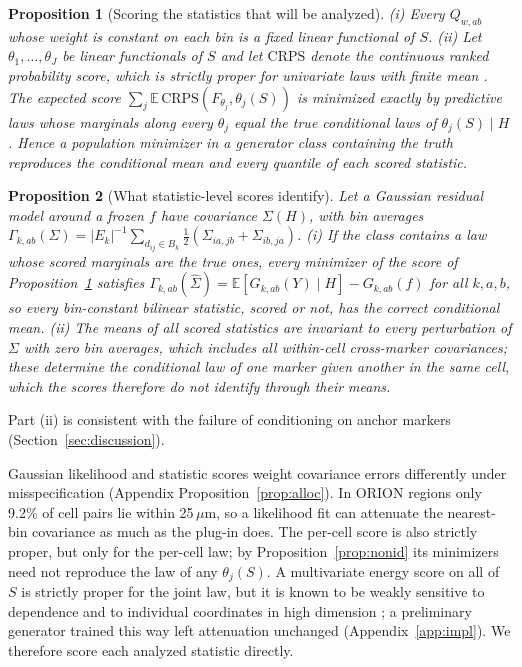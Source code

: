 \documentclass[10pt,letterpaper]{article}
\newtheorem{proposition}{Proposition}
\theoremstyle{definition}
\theoremstyle{remark}
\newcommand{\E}{\mathbb{E}}
\begin{document}
\begin{proposition}[Scoring the statistics that will be analyzed]\label{prop:proper}
(i) Every $Q_{w,ab}$ whose weight is constant on each bin is a fixed linear functional of $S$. (ii) Let $\theta_1,\dots,\theta_J$ be linear functionals of $S$ and let $\mathrm{CRPS}$ denote the continuous ranked probability score, which is strictly proper for univariate laws with finite mean \citep{gneiting2007}. The expected score $\sum_j\E\,\mathrm{CRPS}(F_{\theta_j},\theta_j(S))$ is minimized exactly by predictive laws whose marginals along every $\theta_j$ equal the true conditional laws of $\theta_j(S)\mid H$. Hence a population minimizer in a generator class containing the truth reproduces the conditional mean and every quantile of each scored statistic.
\end{proposition}
\begin{proposition}[What statistic-level scores identify]\label{prop:ident}
Let a Gaussian residual model around a frozen $f$ have covariance $\Sigma(H)$, with bin averages $\Gamma_{k,ab}(\Sigma)=|E_k|^{-1}\sum_{d_{ij}\in B_k}\tfrac12(\Sigma_{ia,jb}+\Sigma_{ib,ja})$. (i) If the class contains a law whose scored marginals are the true ones, every minimizer of the score of Proposition~\ref{prop:proper} satisfies $\Gamma_{k,ab}(\hat\Sigma)=\E[G_{k,ab}(Y)\mid H]-G_{k,ab}(f)$ for all $k,a,b$, so every bin-constant bilinear statistic, scored or not, has the correct conditional mean. (ii) The means of all scored statistics are invariant to every perturbation of $\Sigma$ with zero bin averages, which includes all within-cell cross-marker covariances; these determine the conditional law of one marker given another in the same cell, which the scores therefore do not identify through their means.
\end{proposition}
Part (ii) is consistent with the failure of conditioning on anchor markers (Section~\ref{sec:discussion}).

Gaussian likelihood and statistic scores weight covariance errors differently under misspecification (Appendix Proposition~\ref{prop:alloc}). In ORION regions only 9.2\% of cell pairs lie within 25\,$\mu$m, so a likelihood fit can attenuate the nearest-bin covariance as much as the plug-in does. The per-cell score is also strictly proper, but only for the per-cell law; by Proposition~\ref{prop:nonid} its minimizers need not reproduce the law of any $\theta_j(S)$. A multivariate energy score on all of $S$ is strictly proper for the joint law, but it is known to be weakly sensitive to dependence and to individual coordinates in high dimension \citep{pinson2013}; a preliminary generator trained this way left attenuation unchanged (Appendix~\ref{app:impl}). We therefore score each analyzed statistic directly.
\end{document}
